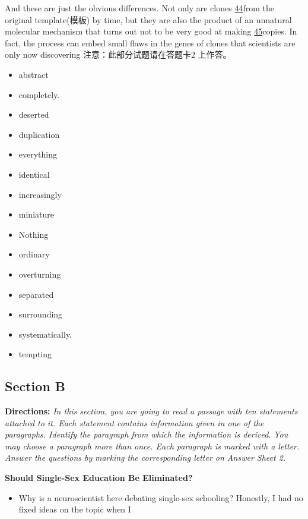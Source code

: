 \documentclass[UTF8,11pt]{ctexart}
\begin{document}
And these are just the obvious differences. Not only are clones \uline{44}from the original template(模板) by time, but they are also the product of an unnatural molecular mechanism that turns out not to be very good at making \uline{45}copies. In fact, the process can embed small flaws in the genes of clones that scientists are only now discovering 注意：此部分试题请在答题卡2 上作答。


\begin{itemize}[leftmargin=2em,itemsep=.2em,topsep=.4em]\item[A.] abstract
\item[B.] completely.
\item[C.] deserted
\item[D.] duplication
\item[E.] everything
\item[F.] identical
\item[G.] increasingly
\item[H.] miniature
\item[I.] Nothing
\item[J.] ordinary
\item[K.] overturning
\item[L.] separated
\item[M.] surrounding
\item[N.] systematically.
\item[O.] tempting
\end{itemize}

\subsection*{\textbf{Section B}}


\textbf{Directions:}\textit{ In this section, you are going to read a passage with ten statements attached to it. Each statement} \textit{contains information given in one of the paragraphs. Identify the paragraph from which the information is derived.} \textit{You may choose a paragraph more than once. Each paragraph is marked with a letter. Answer the questions by} \textit{marking the corresponding letter on Answer Sheet 2.}


\textbf{Should Single-Sex Education Be Eliminated?}


\begin{itemize}[leftmargin=2em,itemsep=.2em,topsep=.4em]\item[A.] Why is a neuroscientist here debating single-sex schooling? Honestly, I had no fixed ideas on the topic when I
\end{itemize}
\end{document}
